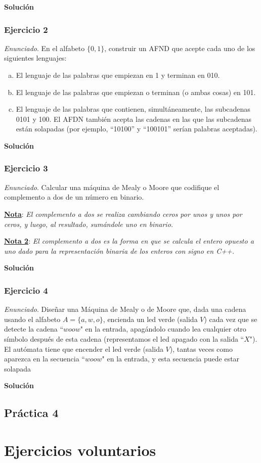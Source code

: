 \documentclass[11pt,a4paper]{article}
\newcommand{\enu}{\textit{Enunciado}}
\newcommand{\sol}{\textbf{Solución}}
\begin{document}
		\sol \par
		
		\subsubsection{Ejercicio 2}
		\enu. En el alfabeto  $\lbrace 0, 1 \rbrace$, construir un AFND que acepte cada uno de los siguientes
		lenguajes:
		
		\begin{enumerate}[a)]
			\item El lenguaje de las palabras que empiezan en 1 y terminan en 010.
			\item El lenguaje de las palabras que empiezan o terminan (o ambas cosas) en 101.
			\item El lenguaje de las palabras que contienen, simultáneamente, las subcadenas 0101 y 100.
			El AFDN también acepta las cadenas en las que las subcadenas están solapadas (por ejemplo, ``10100” y
			``100101” serían palabras aceptadas).
		\end{enumerate}
		
		\sol \par
		
		\subsubsection{Ejercicio 3}
		\enu. Calcular una máquina de Mealy o Moore que codifique el complemento a dos de un número en binario. \par
		\textbf{\underline{Nota}}: \textit{El complemento a dos se realiza cambiando ceros por unos y unos por ceros, y
		luego, al resultado, sumándole uno en binario.} \par
		\textbf{\underline{Nota 2}}: \textit{El complemento a dos es la forma en que se calcula el entero opuesto a uno
		dado para la representación binaria de los enteros con signo en C++.} \par
		
		\sol \par
		
		\subsubsection{Ejercicio 4}
		\enu. Diseñar una Máquina de Mealy o de Moore que, dada una cadena usando el alfabeto $A = \lbrace a, w, o
		\rbrace$, encienda un led verde (salida $V$) cada vez que se detecte la cadena ``$woow$" en la entrada,
		apagándolo cuando lea cualquier otro símbolo después de esta cadena (representamos el led apagado con la
		salida ``$X$"). El autómata tiene que encender el led verde (salida $V$), tantas veces como aparezca en la
		secuencia ``$woow$" en la entrada, y esta secuencia puede estar solapada \par
	
		\sol \par
		
		
	\newpage
	\subsection{Práctica 4}
	
	\newpage
	\section{Ejercicios voluntarios}
\end{document}
